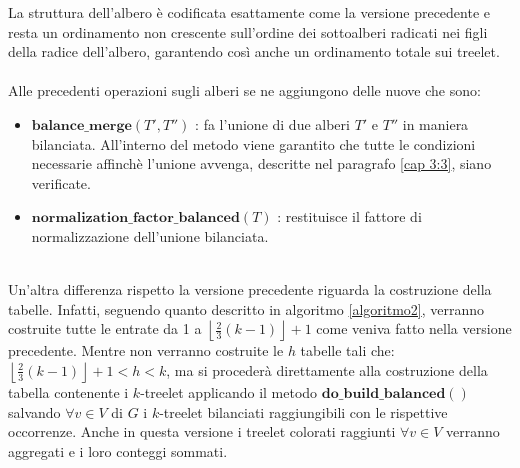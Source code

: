 La struttura dell'albero \`e codificata esattamente come la versione precedente e resta un ordinamento non crescente sull'ordine dei sottoalberi radicati nei figli della radice dell'albero, garantendo cos\`i anche un ordinamento totale sui treelet.\\\\
Alle precedenti operazioni sugli alberi se ne aggiungono delle nuove che sono:
\begin{itemize}
	\item $ \textbf{balance\_merge}(T',T'') $ : fa l'unione di due alberi $ T' $ e $ T'' $ in maniera bilanciata.
	All'interno del metodo viene garantito che tutte le condizioni necessarie affinch\`e l'unione avvenga, descritte nel paragrafo \ref{cap 3:3}, siano verificate.
	\item $ \textbf{normalization\_factor\_balanced}(T) $ : restituisce il fattore di normalizzazione dell'unione bilanciata.
\end{itemize}\mbox{}\\
Un'altra differenza rispetto la versione precedente riguarda la costruzione della tabelle.
Infatti, seguendo quanto descritto in algoritmo \ref{algoritmo2}, verranno costruite tutte le entrate da 1 a  $ \left\lfloor \frac{2}{3}(k-1) \right\rfloor +1 $ come veniva fatto nella versione precedente.
Mentre non verranno costruite le $ h $ tabelle tali che: $ \left\lfloor \frac{2}{3}(k-1) \right\rfloor +1 < h < k $, ma si proceder\`a direttamente alla costruzione della tabella contenente i $ k $-treelet applicando il metodo $ \textbf{do\_build\_balanced}() $ salvando $ \forall v \in V $ di $ G $ i $ k $-treelet bilanciati raggiungibili con le rispettive occorrenze.
Anche in questa versione i treelet colorati raggiunti $ \forall v \in V $ verranno aggregati e i loro conteggi sommati.